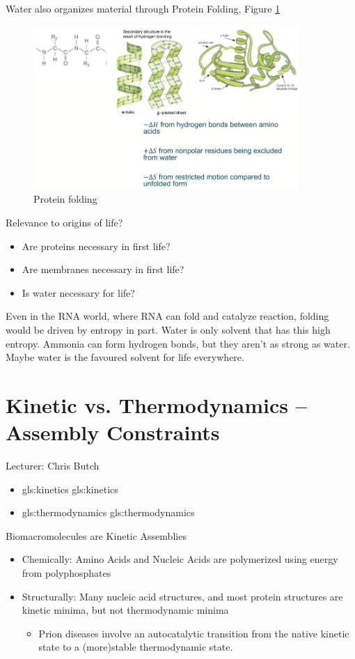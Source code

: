 \documentclass[]{article}
\begin{document}
Water also organizes material through Protein Folding, Figure \ref{fig:ProteinFolding} 
\begin{figure}[H]
	\caption{Protein folding} \label{fig:ProteinFolding} 
	\includegraphics[width=0.9\textwidth]{ProteinFolding}
\end{figure}

 Relevance to origins of life?
\begin{itemize}
	\item Are proteins necessary in first life?
	\item Are membranes necessary in first life?
	\item Is water necessary for life?
\end{itemize}

Even in the RNA world, where RNA can fold and catalyze reaction, folding would be driven by entropy in part. Water is only solvent that has this high entropy. Ammonia can form hydrogen bonds, but they aren't as strong as water. Maybe water is the favoured solvent for life everywhere.

\cite{ball2017water}

\section{Kinetic vs. Thermodynamics – Assembly Constraints}

Lecturer: Chris Butch

\begin{itemize}
	\item \gls{gls:kinetics}  \glsdesc{gls:kinetics}
	\item \gls{gls:thermodynamics} \glsdesc{gls:thermodynamics}
\end{itemize}

Biomacromolecules are Kinetic Assemblies
\begin{itemize}
	\item Chemically: Amino Acids and Nucleic Acids are polymerized using energy from polyphosphates
	\item Structurally: Many nucleic acid structures, and most 	protein structures are kinetic minima, but not thermodynamic minima
	\begin{itemize}
		\item  Prion diseases involve an autocatalytic transition from the native kinetic state to a (more)stable thermodynamic state.
	\end{itemize}
\end{itemize}
\end{document}
